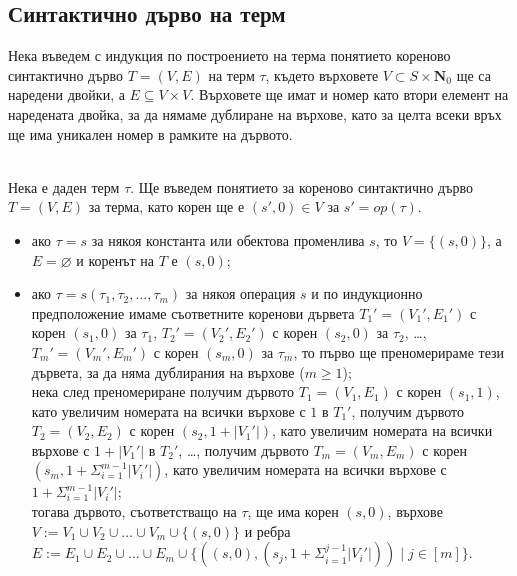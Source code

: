 \documentclass[12pt,twoside,a4paper]{article}
\begin{document}
	\subsection{Синтактично дърво на терм}
	Нека въведем с индукция по построението на терма понятието кореново синтактично дърво $T=(V,E)$ на терм $\tau$, където върховете $V \subset S \times \mathbf{N}_0$ ще са наредени двойки, а $E \subseteq V \times V$. Върховете ще имат и номер като втори елемент на наредената двойка, за да нямаме дублиране на върхове, като за целта всеки връх ще има уникален номер в рамките на дървото.
	
	\begin{definition}\label{def:tree}~\\
		\indent Нека е даден терм $\tau$. Ще въведем понятието за кореново синтактично дърво $T=(V,E)$ за терма, като корен ще е $(s',0) \in V$ за $s' = op(\tau)$.
		\begin{itemize}
			\item ако $\tau = s$ за някоя константа или обектова променлива $s$, то $V=\{(s,0)\}$, а $E=\varnothing$ и коренът на $T$ е $(s,0)$;
			\item ако $\tau = s(\tau_1,\tau_2,\dots,\tau_m)$ за някоя операция $s$ и по индукционно предположение имаме съответните коренови дървета $T_1'=(V_1',E_1')$ с корен $(s_1, 0)$ за $\tau_1$, $T_2'=(V_2',E_2')$ с корен $(s_2, 0)$ за $\tau_2$, \dots, $T_m'=(V_m',E_m')$ с корен $(s_m, 0)$ за $\tau_m$, то първо ще преномерираме тези дървета, за да няма дублирания на върхове ($ m \ge 1$);\\
			нека след преномериране получим дървото $T_1=(V_1,E_1)$ с корен $(s_1, 1)$, като увеличим номерата на всички върхове с $1$ в $T_1'$, получим дървото $T_2=(V_2,E_2)$ с корен $(s_2, 1+|V_1'|)$, като увеличим номерата на всички върхове с $1+|V_1'|$ в $T_2'$, \dots, получим дървото $T_m=(V_m,E_m)$ с корен $(s_m, 1+\Sigma_{i=1}^{m-1}{|V_i'|})$, като увеличим номерата на всички върхове с $1+\Sigma_{i=1}^{m-1}{|V_i'|}$;\\
			тогава дървото, съответстващо на $\tau$, ще има корен $(s,0)$, върхове $V := V_1 \cup V_2 \cup \dots \cup V_m \cup \{(s, 0)\}$ и ребра $E := E_1 \cup E_2 \cup \dots \cup E_m \cup \{((s, 0), (s_j, 1+\Sigma_{i=1}^{j-1}{|V_i'|})) \mid j \in [m]\}$.
		\end{itemize}
	\end{definition}
	
\end{document}
